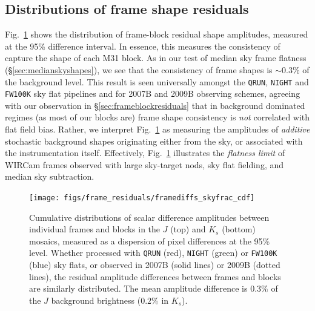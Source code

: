 \documentclass[iop]{emulateapj}
\newcommand{\mycomment}[1]{\textcolor{OliveGreen}{\textit{#1}}} %
\newcommand{\Fig}[1]{Fig.~\ref{fig:#1}}  %
\newcommand{\Sec}[1]{\S\ref{sec:#1}}  %
\begin{document}
\subsection{Distributions of frame shape residuals}
\label{sec:frameblockresidualhist}

\Fig{frame_diffs_skyfrac} shows the distribution of frame-block residual shape amplitudes, measured at the 95\% difference interval.
In essence, this measures the consistency of capture the shape of each M31 block.
As in our test of median sky frame flatness (\Sec{medianskyshapes}), we see that the consistency of frame shapes is $\sim 0.3\%$ of the background level.
This result is seen universally amongst the \texttt{QRUN}, \texttt{NIGHT}  and \texttt{FW100K} sky flat pipelines and for 2007B and 2009B observing schemes, agreeing with our observation in \Sec{frameblockresiduals} that in background dominated regimes (as most of our blocks are) frame shape consistency is \emph{not} correlated with flat field bias.
Rather, we interpret \Fig{frame_diffs_skyfrac} as measuring the amplitudes of \emph{additive} stochastic background shapes originating either from the sky, or associated with the instrumentation itself.
Effectively, \Fig{frame_diffs_skyfrac} illustrates the \emph{flatness limit} of WIRCam frames observed with large sky-target nods, sky flat fielding, and median sky subtraction.

\begin{figure}[t]
\centering
\texttt{[image: figs/frame\_residuals/framediffs\_skyfrac\_cdf]}
\caption{Cumulative distributions of scalar difference amplitudes between individual frames and blocks in the $J$ (top) and $K_s$ (bottom) mosaics, measured as a dispersion of pixel differences at the 95\% level.
  Whether processed with \texttt{QRUN} (red), \texttt{NIGHT} (green) or \texttt{FW100K} (blue) sky flats, or observed in 2007B (solid lines) or 2009B (dotted lines), the residual amplitude differences between frames and blocks are similarly distributed.
The mean amplitude difference is $0.3\%$ of the $J$ background brightness ($0.2\%$ in $K_s$).
}
\label{fig:frame_diffs_skyfrac}
\end{figure}

\end{document}
